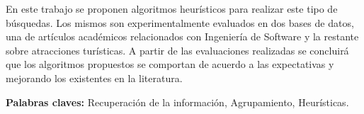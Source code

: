 En este trabajo se proponen algoritmos heurísticos para realizar este tipo de búsquedas. Los mismos son experimentalmente evaluados en dos bases de datos, una de artículos académicos relacionados con Ingeniería de Software y la restante sobre atracciones turísticas. A partir de las evaluaciones realizadas se concluirá que los algoritmos propuestos se comportan de acuerdo a las expectativas y mejorando los existentes en la literatura.
\bigskip



\noindent\textbf{Palabras claves:} Recuperación de la información, Agrupamiento, Heurísticas.